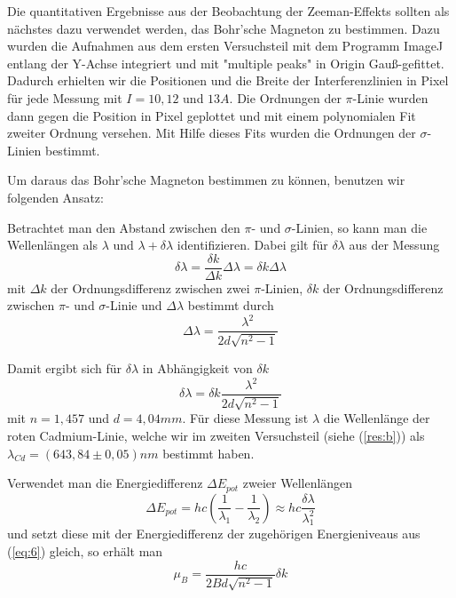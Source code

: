 Die quantitativen Ergebnisse aus der Beobachtung der Zeeman-Effekts sollten als nächstes dazu verwendet werden, das Bohr'sche Magneton zu bestimmen. Dazu wurden die Aufnahmen aus dem ersten Versuchsteil mit dem Programm ImageJ entlang der Y-Achse integriert und mit "multiple peaks" in Origin Gauß-gefittet. Dadurch erhielten wir die Positionen und die Breite der Interferenzlinien in Pixel für jede Messung mit $I = 10, 12$ und $13 A$. Die Ordnungen der $\pi$-Linie wurden dann gegen die Position in Pixel geplottet und mit einem polynomialen Fit zweiter Ordnung versehen. Mit Hilfe dieses Fits wurden die Ordnungen der $\sigma$-Linien bestimmt.

Um daraus das Bohr'sche Magneton bestimmen zu können, benutzen wir folgenden Ansatz:

Betrachtet man den Abstand zwischen den $\pi$- und $\sigma$-Linien, so kann man die Wellenlängen als $\lambda$ und $\lambda + \delta \lambda$ identifizieren. Dabei gilt für $\delta \lambda$ aus der Messung
\begin{equation} \label{eq:11}
\delta \lambda = \frac{\delta k}{\Delta k} \Delta \lambda = \delta k \Delta \lambda
\end{equation}
mit $\Delta k$ der Ordnungsdifferenz zwischen zwei $\pi$-Linien, $\delta k$ der Ordnungsdifferenz zwischen $\pi$- und $\sigma$-Linie und $\Delta\lambda$ bestimmt durch
\begin{equation} \label{eq:12}
\Delta \lambda = \frac{\lambda^2}{2d \sqrt{n^2 -1}} 
\end{equation}

Damit ergibt sich für $\delta \lambda$ in Abhängigkeit von $\delta k$
\begin{equation} \label{eq:13}
\delta \lambda = \delta k \frac{\lambda^2}{2d \sqrt{n^2 -1}}
\end{equation}
mit $n = 1,457$ und $d = 4,04 mm$. Für diese Messung ist $\lambda$ die Wellenlänge der roten Cadmium-Linie, welche wir im zweiten Versuchsteil (siehe (\ref{res:b})) als $\lambda_{Cd} = (643,84 \pm 0,05) nm$ bestimmt haben.

Verwendet man die Energiedifferenz $\Delta E_{pot}$ zweier Wellenlängen
\begin{equation} \label{eq:14}
\Delta E_{pot} = hc (\frac{1}{\lambda_1}-\frac{1}{\lambda_2}) \approx hc \frac{\delta \lambda}{\lambda_1^2}
\end{equation}
und setzt diese mit der Energiedifferenz der zugehörigen Energieniveaus aus (\ref{eq:6}) gleich, so erhält man
\begin{equation} \label{eq:15}
\mu_B = \frac{hc}{2Bd \sqrt{n^2 -1}} \delta k
\end{equation}


